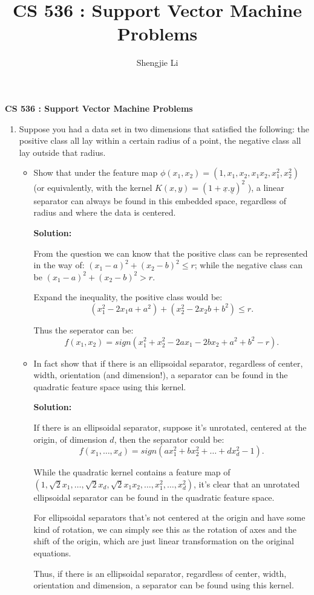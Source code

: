 \documentclass[letter, 12pt]{article}
\author{Shengjie Li}
\title{CS 536 : Support Vector Machine Problems}
\begin{document}
    \centerline{\textbf{CS 536 : Support Vector Machine Problems}}
    \begin{enumerate}
    	\item{Suppose you had a data set in two dimensions that satisfied the following: the positive class all lay within a certain radius of a point, the negative class all lay outside that radius.}
    	\begin{itemize}
    		\item{Show that under the feature map $ \phi(x_1 , x_2 ) = (1, x_1 , x_2 , x_1 x_2 , x_{1}^2 , x_{2}^2 ) $ (or equivalently, with the kernel $ K(x, y) = (1 + \underline{x}.\underline{y})^2 $ ), a linear separator can always be found in this embedded space, regardless of radius and where the data is centered.}
    		\par{\textbf{Solution:}}
    		\par{From the question we can know that the positive class can be represented in the way of: $ (x_1 - a)^2 + (x_2 - b)^2 \le r $; while the negative class can be $ (x_1 - a)^2 + (x_2 - b)^2 > r $.}
    		\par{Expand the inequality, the positive class would be:}
    			\[(x_1^2 - 2 x_1 a + a^2) + (x_2^2 - 2 x_2 b + b^2) \le r. \]
    		\par{Thus the seperator can be:}
    			\[f(x_1, x_2) = sign(x_1^2 + x_2^2 - 2a x_1 - 2b x_2 + a^2 + b^2 - r). \]
    		\item{In fact show that if there is an ellipsoidal separator, regardless of center, width, orientation (and dimension!), a separator can be found in the quadratic feature space using this kernel.}
    		\par{\textbf{Solution:}}
    		\par{If there is an ellipsoidal separator, suppose it's unrotated, centered at the origin, of dimension $ d $, then the separator could be:}
    		\[ f(x_1, \dots, x_d) = sign(ax_1^2 + bx_2^2 + \dots + dx_d^2 - 1). \]
    		\par{While the quadratic kernel contains a feature map of $ (1, \sqrt{2}x_1, \dots, \sqrt{2}x_d, \sqrt{2}x_1x_2, \dots, x_1^2, \dots, x_d^2)$, it's clear that an unrotated ellipsoidal separator can be found in the quadratic feature space.}
    		\par{For ellipsoidal separators that's not centered at the origin and have some kind of rotation, we can simply see this as the rotation of axes and the shift of the origin, which are just linear transformation on the original equations.}
    		\par{Thus, if there is an ellipsoidal separator, regardless of center, width, orientation and dimension, a separator can be found using this kernel.}

\end{itemize}
\end{enumerate}
\end{document}
